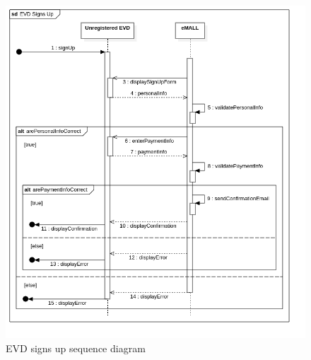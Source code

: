 \begin{center}
    \begin{figure} [H]
        \begin{center}
            \includegraphics[width=0.9\linewidth]{Images/SequenceDiagrams/evd_signs_up}
            \caption{EVD signs up sequence diagram}
            \label{fig: evd_sign_up_seq_diag}
        \end{center}
    \end{figure}
\end{center}

